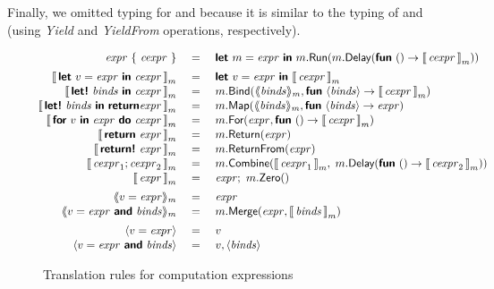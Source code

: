\documentclass[runningheads,a4paper]{llncs}
\begin{document}
Finally, we omitted typing for  and  because it is similar to the 
typing of  and  (using \emph{Yield} and \emph{YieldFrom} operations,
respectively).


\begin{figure}[t]
\begin{equation*}
\hspace{-1em}\begin{array}{rcl}
\expr ~\{~ \cexpr ~\} &~=~& \kvd{let}~m = \expr ~\kvd{in}~m.\ident{Run}(m.\ident{Delay}(\kvd{fun}~() \rightarrow \tsl{\cexpr}))
\\[0.5em]
\tsl{\kvd{let}~v=\expr~\kvd{in}~\cexpr}          &=& \kvd{let}~v=\expr~\kvd{in}~\tsl{\cexpr} \\[0.08em]
\tsl{\kvd{let!}~\binds~\kvd{in}~\cexpr}          &=& m.\ident{Bind}(\tsb{\binds},\kvd{fun}~\tsv{\binds}\rightarrow \tsl{\cexpr}) \\[0.08em]
\tsl{\kvd{let!}~\binds~\kvd{in}~\kvd{return}\expr}          &=&
   m.\ident{Map}(\tsb{\binds},\kvd{fun}~\tsv{\binds}\rightarrow \expr) \\[0.08em]
\tsl{\kvd{for}~v~\kvd{in}~\expr~\kvd{do}~\cexpr} &=& m.\ident{For}(\expr,\kvd{fun}~()\rightarrow \tsl{\cexpr}) \\[0.08em]
%
\tsl{\kvd{return}~\expr}   &=& m.\ident{Return}(\expr) \\[0.08em]
\tsl{\kvd{return!}~\expr}  &=& m.\ident{ReturnFrom}(\expr) \\[0.08em]
\tsl{\cexpr_1; \cexpr_2}   &=& m.\ident{Combine}(\tsl{\cexpr_1}, \;m.\ident{Delay}(\kvd{fun}~() \rightarrow \tsl{\cexpr_2} )) \\[0.08em]
\tsl{\expr}                &=& \expr; ~m.\ident{Zero}()
\\[0.5em]
\tsb{v=\expr} &=& \expr \\[0.08em]
\tsb{v=\expr ~\kvd{and}~\binds} &=& m.\ident{Merge}(\expr, \tsl{\binds})
\\[0.5em]
\tsv{v=\expr} &=& v \\[0.08em]
\tsv{v=\expr ~\kvd{and}~\binds} &=& v, \tsv{\binds} 
\end{array}
\end{equation*}
\vspace{-1.2em}
\caption{Translation rules for computation expressions}
\label{fig:translation}
\vspace{-1em}
\end{figure}
\end{document}

